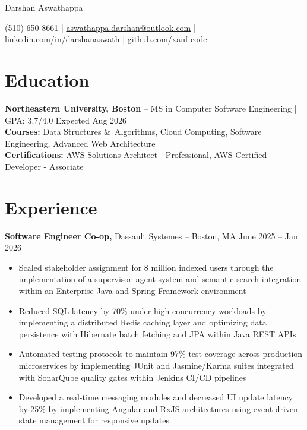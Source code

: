 \documentclass[11pt]{article}       %
\begin{document}
\centerline{\Huge Darshan Aswathappa}

\vspace{5pt}

\centerline{(510)-650-8661 | \href{mailto:aswathappa.darshan@outlook.com}{aswathappa.darshan@outlook.com} | \href{https://www.linkedin.com/in/darshanaswath/}{linkedin.com/in/darshanaswath} | \href{https://github.com/xanf-code}{github.com/xanf-code}}

\vspace{-10pt}

\section*{Education}
\textbf{Northeastern University, Boston} -- MS in Computer Software Engineering | GPA: 3.7/4.0 
\hfill Expected Aug 2026 \\
\vspace{3px}
\textbf{Courses:} Data Structures \&\ Algorithms, Cloud Computing, Software Engineering, Advanced Web Architecture \\
\vspace{3px}
\textbf{Certifications:} AWS Solutions Architect - Professional, AWS Certified Developer - Associate
\vspace{-6.5pt}

\section*{Experience}

\textbf{Software Engineer Co-op,} {Dassault Systemes} -- Boston, MA \hfill June 2025 -- Jan 2026 \\
\vspace{-9pt}
\begin{itemize}
  \item Scaled stakeholder assignment for 8 million indexed users through the implementation of a supervisor–agent system and semantic search integration within an Enterprise Java and Spring Framework environment
  \item Reduced SQL latency by 70\% under high-concurrency workloads by implementing a distributed Redis caching layer and optimizing data persistence with Hibernate batch fetching and JPA within Java REST APIs
  \item Automated testing protocols to maintain 97\% test coverage across production microservices by implementing JUnit and Jasmine/Karma suites integrated with SonarQube quality gates within Jenkins CI/CD pipelines
  \item Developed a real-time messaging modules and decreased UI update latency by 25\% by implementing Angular and RxJS architectures using event-driven state management for responsive updates
\end{itemize}
\end{document}
